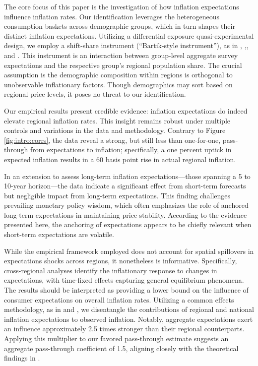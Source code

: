 \documentclass[12pt]{article}
\begin{document}
The core focus of this paper is the investigation of how inflation expectations influence inflation rates. Our identification leverages the heterogeneous consumption baskets across demographic groups, which in turn shapes their distinct inflation expectations. Utilizing a differential exposure quasi-experimental design, we employ a shift-share instrument (``Bartik-style instrument''), as in \cite{Bartik:1991}, \cite{BlanchardKatz},\cite{Almas:AER2012}, and \cite{Pinkhametal:AER2020}. This instrument is an interaction between group-level aggregate survey expectations and the respective group's regional population share. The crucial assumption is the demographic composition within regions is orthogonal to unobservable inflationary factors. Though demographics may sort based on regional price levels, it poses no threat to our identification. 

Our empirical results present credible evidence: inflation expectations do indeed elevate regional inflation rates. This insight remains robust under multiple controls and variations in the data and methodology. Contrary to Figure \ref{fig:intro:corrs}, the data reveal a strong, but still less than one-for-one,  pass-through from expectations to inflation; specifically, a one percent uptick in expected inflation results in a 60 basis point rise in actual regional inflation.

In an extension to assess long-term inflation expectations—those spanning a 5 to 10-year horizon—the data indicate a significant effect from short-term forecasts but negligible impact from long-term expectations. This finding challenges prevailing monetary policy wisdom, which often emphasizes the role of anchored long-term expectations in maintaining price stability. According to the evidence presented here, the anchoring of expectations appears to be chiefly relevant when short-term expectations are volatile.

While the empirical framework employed does not account for spatial spillovers in expectations shocks across regions, it nonetheless is informative. Specifically, cross-regional analyses identify the inflationary response to changes in expectations, with time-fixed effects capturing general equilibrium phenomena. The results should be interpreted as providing a lower bound on the influence of consumer expectations on overall inflation rates. Utilizing a common effects methodology, as in \cite{Pesaran:2006} and \cite{HardingLamarche:EL}, we disentangle the contributions of regional and national inflation expectations to observed inflation. Notably, aggregate expectations exert an influence approximately 2.5 times stronger than their regional counterparts. Applying this multiplier to our favored pass-through estimate suggests an aggregate pass-through coefficient of 1.5,  aligning closely with the theoretical findings in \cite{Werning:expectsWP}.
\end{document}
